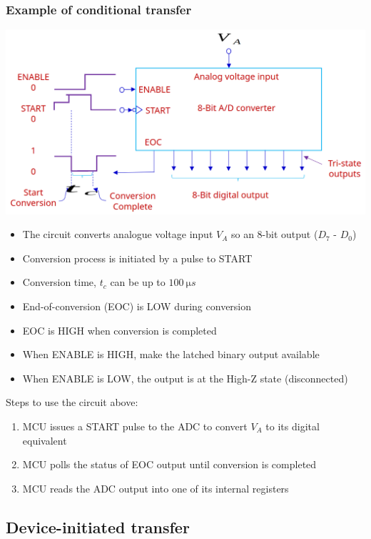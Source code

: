 \documentclass[11pt]{article}
\begin{document}
\subsubsection{Example of conditional transfer}
\label{sec:org780030a}
\begin{center}
\includegraphics[width=.9\linewidth]{./images/conditional-transfer-example.png}
\end{center}
\begin{itemize}
\item The circuit converts analogue voltage input \(V_A\) so an 8-bit output (\(D_7\) - \(D_0\))
\item Conversion process is initiated by a pulse to START
\item Conversion time, \(t_c\) can be up to \(\qty{100}{\micro s}\)
\item End-of-conversion (EOC) is LOW during conversion
\item EOC is HIGH when conversion is completed
\item When ENABLE is HIGH, make the latched binary output available
\item When ENABLE is LOW, the output is at the High-Z state (disconnected)
\end{itemize}

Steps to use the circuit above:
\begin{enumerate}
\item MCU issues a START pulse to the ADC to convert \(V_A\) to its digital equivalent
\item MCU polls the status of EOC output until conversion is completed
\item MCU reads the ADC output into one of its internal registers
\end{enumerate}
\subsection{Device-initiated transfer}
\label{sec:orgdaa8fea}
\end{document}
